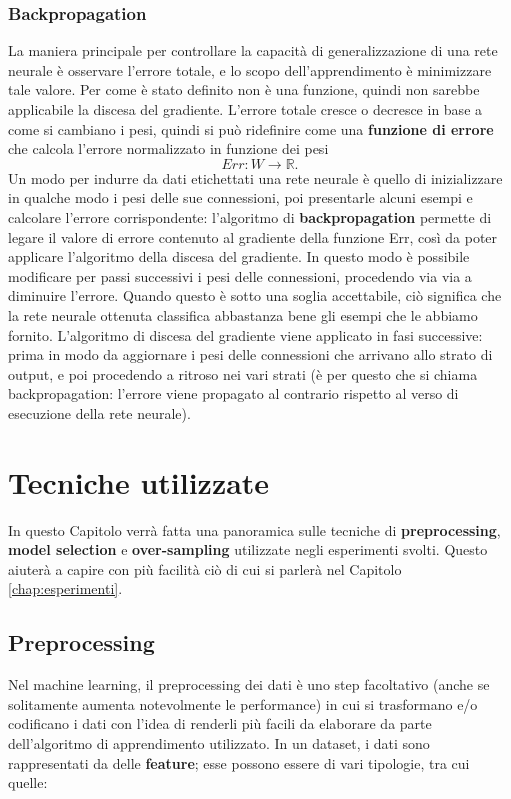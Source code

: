 \documentclass[12pt, twoside, letterpaper]{report}
\begin{document}
			\subsection{Backpropagation}
				La maniera principale per controllare la capacità di generalizzazione di una rete neurale è osservare l'errore totale, e lo scopo dell'apprendimento è minimizzare tale valore. Per come è stato definito non è una funzione, quindi non sarebbe applicabile la discesa del gradiente. L'errore totale cresce o decresce in base a come si cambiano i pesi, quindi si può ridefinire come una \textbf{funzione di errore} che calcola l'errore normalizzato in funzione dei pesi 
				$$Err : W \rightarrow \mathbb{R}.$$
				Un modo per indurre da dati etichettati una rete neurale è quello di inizializzare in qualche modo i pesi delle sue connessioni, poi presentarle alcuni esempi e calcolare l'errore corrispondente: l'algoritmo di \textbf{backpropagation} permette di legare il valore di errore contenuto al gradiente della funzione Err, così da poter applicare l'algoritmo della discesa del gradiente. In questo modo è possibile modificare per passi successivi i pesi delle connessioni, procedendo via via a diminuire l'errore. Quando questo è sotto una soglia accettabile, ciò significa che la rete neurale ottenuta classifica abbastanza bene gli esempi che le abbiamo fornito. L'algoritmo di discesa del gradiente viene applicato in fasi successive: prima in modo da aggiornare i pesi delle connessioni che arrivano allo strato di output, e poi procedendo a ritroso nei vari strati (è per questo che si chiama backpropagation: l'errore viene propagato al contrario rispetto al verso di esecuzione della rete neurale).
				
				

				
				
	\chapter{Tecniche utilizzate}
		In questo Capitolo verrà fatta una panoramica sulle tecniche di \textbf{preprocessing}, \textbf{model selection} e \textbf{over-sampling} utilizzate negli esperimenti svolti. Questo aiuterà a capire con più facilità ciò di cui si parlerà nel Capitolo \ref{chap:esperimenti}.
		\section{Preprocessing}
			Nel machine learning, il preprocessing dei dati è uno step facoltativo (anche se solitamente aumenta notevolmente le performance) in cui si trasformano e/o codificano i dati con l'idea di renderli più facili da elaborare da parte dell'algoritmo di apprendimento utilizzato. In un dataset, i dati sono rappresentati da delle \textbf{feature}; esse possono essere di vari tipologie, tra cui quelle: 
			
\end{document}
